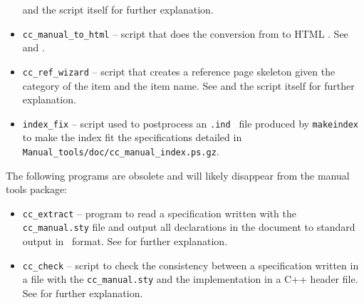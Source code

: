\begin{itemize}
         and the script itself for further explanation.
   \item \verb|cc_manual_to_html|%
         -- script that does the conversion from  
            to HTML%
            .  
            See 
         and .
   \item \verb|cc_ref_wizard|%
         -- script that creates a reference page skeleton
         given the category of the item and the item name. See
         and the script itself for further explanation.
   \item \verb|index_fix|%
         -- script used to postprocess an {\tt .ind } file 
         produced by {\tt makeindex} to make the index fit the specifications
         detailed in %
         {{\tt Manual\_tools/doc/cc\_manual\_index.ps.gz}}.
\end{itemize}


The following programs are obsolete and will likely disappear from the
manual tools package:
\begin{itemize}
   \item \verb|cc_extract|%
          -- program to read a specification written with
         the \verb|cc_manual.sty| file and output all declarations in the
         document to standard output in \CC\ format. 
         See  for further explanation.
   \item \verb|cc_check|%
         -- script to check the consistency between a 
         specification written in a  file with the 
         \verb|cc_manual.sty| 
         and the implementation in a C++ header file.  See
         for further explanation.
\end{itemize}
\ccModifierCrossRefOn


